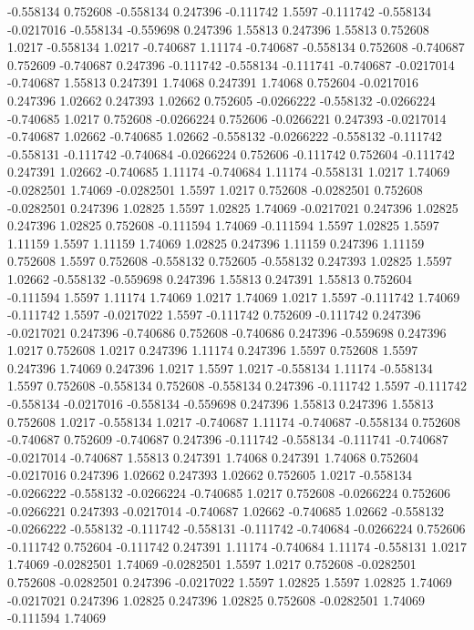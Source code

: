 -0.558134 0.752608
-0.558134 0.247396
-0.111742 1.5597
-0.111742 -0.558134
-0.0217016 -0.558134
-0.559698 0.247396
1.55813 0.247396
1.55813 0.752608
1.0217 -0.558134
1.0217 -0.740687
1.11174 -0.740687
-0.558134 0.752608
-0.740687 0.752609
-0.740687 0.247396
-0.111742 -0.558134
-0.111741 -0.740687
-0.0217014 -0.740687
1.55813 0.247391
1.74068 0.247391
1.74068 0.752604
-0.0217016 0.247396
1.02662 0.247393
1.02662 0.752605
-0.0266222 -0.558132
-0.0266224 -0.740685
1.0217 0.752608
-0.0266224 0.752606
-0.0266221 0.247393
-0.0217014 -0.740687
1.02662 -0.740685
1.02662 -0.558132
-0.0266222 -0.558132
-0.111742 -0.558131
-0.111742 -0.740684
-0.0266224 0.752606
-0.111742 0.752604
-0.111742 0.247391
1.02662 -0.740685
1.11174 -0.740684
1.11174 -0.558131
1.0217 1.74069
-0.0282501 1.74069
-0.0282501 1.5597
1.0217 0.752608
-0.0282501 0.752608
-0.0282501 0.247396
1.02825 1.5597
1.02825 1.74069
-0.0217021 0.247396
1.02825 0.247396
1.02825 0.752608
-0.111594 1.74069
-0.111594 1.5597
1.02825 1.5597
1.11159 1.5597
1.11159 1.74069
1.02825 0.247396
1.11159 0.247396
1.11159 0.752608
1.5597 0.752608
-0.558132 0.752605
-0.558132 0.247393
1.02825 1.5597
1.02662 -0.558132
-0.559698 0.247396
1.55813 0.247391
1.55813 0.752604
-0.111594 1.5597
1.11174 1.74069
1.0217 1.74069
1.0217 1.5597
-0.111742 1.74069
-0.111742 1.5597
-0.0217022 1.5597
-0.111742 0.752609
-0.111742 0.247396
-0.0217021 0.247396
-0.740686 0.752608
-0.740686 0.247396
-0.559698 0.247396
1.0217 0.752608
1.0217 0.247396
1.11174 0.247396
1.5597 0.752608
1.5597 0.247396
1.74069 0.247396
1.0217 1.5597
1.0217 -0.558134
1.11174 -0.558134
1.5597 0.752608
-0.558134 0.752608
-0.558134 0.247396
-0.111742 1.5597
-0.111742 -0.558134
-0.0217016 -0.558134
-0.559698 0.247396
1.55813 0.247396
1.55813 0.752608
1.0217 -0.558134
1.0217 -0.740687
1.11174 -0.740687
-0.558134 0.752608
-0.740687 0.752609
-0.740687 0.247396
-0.111742 -0.558134
-0.111741 -0.740687
-0.0217014 -0.740687
1.55813 0.247391
1.74068 0.247391
1.74068 0.752604
-0.0217016 0.247396
1.02662 0.247393
1.02662 0.752605
1.0217 -0.558134
-0.0266222 -0.558132
-0.0266224 -0.740685
1.0217 0.752608
-0.0266224 0.752606
-0.0266221 0.247393
-0.0217014 -0.740687
1.02662 -0.740685
1.02662 -0.558132
-0.0266222 -0.558132
-0.111742 -0.558131
-0.111742 -0.740684
-0.0266224 0.752606
-0.111742 0.752604
-0.111742 0.247391
1.11174 -0.740684
1.11174 -0.558131
1.0217 1.74069
-0.0282501 1.74069
-0.0282501 1.5597
1.0217 0.752608
-0.0282501 0.752608
-0.0282501 0.247396
-0.0217022 1.5597
1.02825 1.5597
1.02825 1.74069
-0.0217021 0.247396
1.02825 0.247396
1.02825 0.752608
-0.0282501 1.74069
-0.111594 1.74069
